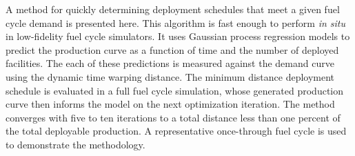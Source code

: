 A method for quickly determining deployment schedules that meet a given 
fuel cycle demand is presented here. This algorithm is fast enough to 
perform \emph{in situ} in low-fidelity fuel cycle simulators. It uses
Gaussian process regression models to predict the production curve as a 
function of time and the number of deployed facilities. The each of these
predictions is measured against the demand curve using the dynamic time
warping distance. The minimum distance deployment schedule is evaluated
in a full fuel cycle simulation, whose generated production curve 
then informs the model on the next optimization iteration. The method
converges with five to ten iterations to a total distance less than one 
percent of the total deployable production. A representative once-through
fuel cycle is used to demonstrate the methodology.

